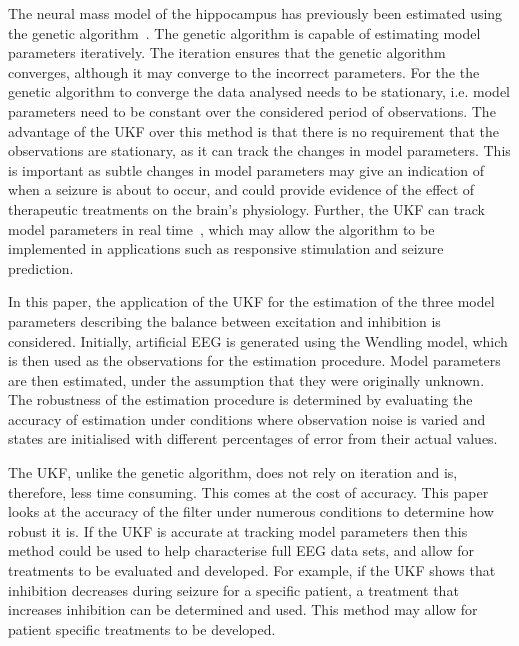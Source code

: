 The neural mass model of the hippocampus has previously been estimated using the genetic algorithm~\citep{wendling2005interictal}. The genetic algorithm is capable of estimating model parameters iteratively. The iteration ensures that the genetic algorithm converges, although it may converge to the incorrect parameters. For the the genetic algorithm to converge the data analysed needs to be stationary, i.e. model parameters need to be constant over the considered period of observations. The advantage of the UKF over this method is that there is no requirement that the observations are stationary, as it can track the changes in model parameters. This is important as subtle changes in model parameters may give an indication of when a seizure is about to occur, and could provide evidence of the effect of therapeutic treatments on the brain's physiology. Further, the UKF can track model parameters in real time~\iref, which may allow the algorithm to be implemented in applications such as responsive stimulation and seizure prediction.





In this paper, the application of the UKF for the estimation of the three model parameters describing the balance between excitation and inhibition is considered. Initially, artificial EEG is generated using the Wendling model, which is then used as the observations for the estimation procedure. Model parameters are then estimated, under the assumption that they were originally unknown. The robustness of the estimation procedure is determined by evaluating the accuracy of estimation under conditions where observation noise is varied and states are initialised with different percentages of error from their actual values.

The UKF, unlike the genetic algorithm, does not rely on iteration and is, therefore, less time consuming. This comes at the cost of accuracy. This paper looks at the accuracy of the filter under numerous conditions to determine how robust it is. If the UKF is accurate at tracking model parameters then this method could be used to help characterise full EEG data sets, and allow for treatments to be evaluated and developed. For example, if the UKF shows that inhibition decreases during seizure for a specific patient, a treatment that increases inhibition can be determined and used. This method may allow for patient specific treatments to be developed.

